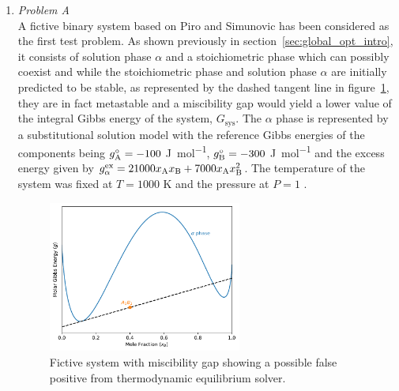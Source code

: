 	\begin{enumerate}
	\item	\emph{Problem A}\\
		A fictive binary   system based on Piro and Simunovic \cite{Piro16} has been considered as the first test problem. As shown previously in section~\ref{sec:global_opt_intro}, it consists of solution phase $\alpha$ and a stoichiometric phase  which can possibly coexist and while the stoichiometric phase  and solution phase $\alpha$ are initially predicted to be stable, as represented by the dashed tangent line in figure~\ref{fig:testA}, they are in fact metastable and a miscibility gap would yield a lower value of the integral Gibbs energy of the system, $G_\text{sys}$. The $\alpha$ phase is represented by a substitutional solution model with the reference Gibbs energies of the components being $g_{\ce{A}}^\circ = -100 $ \si{\joule \per \mole}, $g_{\ce{B}}^\circ = -300$ \si{\joule \per \mole} and the excess energy given by $g_{\alpha}^\text{ex} = 21000 x_{\ce{A}} x_{\ce{B}} + 7000 x_{\ce{A}} x_{\ce{B}}^2$. The temperature of the system was fixed at $T = 1000$ \si{\kelvin} and the pressure at $P=1$ \si{\atmosphere}.
		\begin{figure}[htbp]			
			\centering
			\includegraphics[width=0.6\textwidth]{figures/chapter-6/System_AB.pdf}
			\caption[Global optimisation test problem A: Fictive system with miscibility gap showing a possible false positive from thermodynamic equilibrium solver.]{Fictive system with miscibility gap showing a possible false positive from thermodynamic equilibrium solver.}
			\label{fig:testA}
		\end{figure}
 

\end{enumerate}
